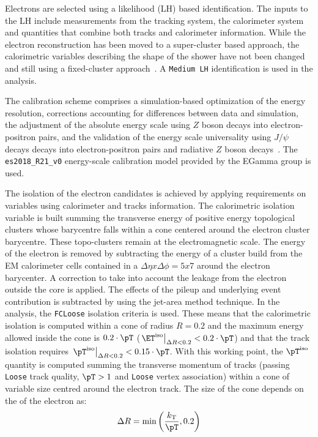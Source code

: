 Electrons are selected using a likelihood (LH) based identification. The inputs to the LH include measurements from the tracking system, the calorimeter system and quantities that combine both tracks and calorimeter information. While the electron reconstruction has been moved to a super-cluster based approach, the calorimetric variables describing the shape of the shower have not been changed and still using a fixed-cluster approach~\cite{Anastopoulos:2652163}. A \texttt{Medium LH} identification is used in the analysis.

The calibration scheme comprises a simulation-based optimization of the energy resolution, corrections accounting for differences between data and simulation, the adjustment of the absolute energy scale using $Z$ boson decays into electron-positron pairs, and the validation of the energy scale universality using $J/\psi$ decays decays into electron-positron pairs and radiative $Z$ boson decays~\cite{Andari:2655306}. The \texttt{es2018\_R21\_v0} energy-scale calibration model provided by the EGamma group is used.

The isolation of the electron candidates is achieved by applying requirements on variables using calorimeter and tracks information. The calorimetric isolation variable is built summing the transverse energy of positive energy topological clusters whose barycentre falls within a cone centered around the electron cluster barycentre. These topo-clusters remain at the electromagnetic scale. The energy of the electron is removed by subtracting the energy of a cluster build from the EM calorimeter cells contained in a $\Delta\eta x\Delta\phi=5x7$ around the electron barycenter. A correction to take into account the leakage from the electron outside the core is applied. The effects of the pileup and underlying event contribution is subtracted by using the jet-area method technique. In the analysis, the \texttt{FCLoose} isolation criteria is used. These means that the calorimetric isolation is computed within a cone of radius $R=0.2$ and the maximum energy allowed inside the cone is $0.2\cdot\pT$ ($\left.\ET^\text{iso}\right|_{\Delta R<0.2}<0.2\cdot\pT$) and that
the track isolation requires $\left.\pT^\text{iso}\right|_{\Delta R<0.2}<0.15\cdot\pT$. With this working point, the $\pT^\text{iso}$ quantity is computed summing the transverse momentum of tracks (passing \texttt{Loose} track quality, $\pT>1$ and \texttt{Loose} vertex association) within a cone of variable size centred around the electron track. The size of the cone depends on the \pT of the electron as:
\begin{equation}
  \Delta R = \textrm{min}\left(\frac{k_\text{T}}{\pT},0.2\right)
\end{equation}

